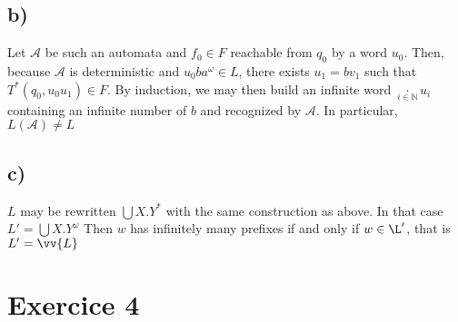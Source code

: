 \documentclass{article}
\newcommand{\A}{\mathcal{A}}
\newcommand{\N}{\mathbb{N}}
\begin{document}
\subsection*{b)}

Let $\A$ be such an automata and $f_0 \in F$ reachable from $q_0$ by a word $u_0$.
Then, because $\A$ is deterministic and $u_0ba^\omega \in L$, there exists $u_1=bv_1$ such that $T^*(q_0,u_0u_1) \in F$.\newline
By induction, we may then build an infinite word $\underset{i \in \N}{\cdot}u_i$ containing an infinite number of $b$ and recognized by $\A$.
In particular, $L(\A) \neq L$

\subsection*{c)}

$L$ may be rewritten $\bigcup X.Y^*$ with the same construction as above. In that case $L' = \bigcup X.Y^\omega$\newline
Then $w$ has infinitely many prefixes if and only if $w \in \L'$, that is $L'=\vv{L}$


\section*{Exercice 4}




\newpage
\end{document}

